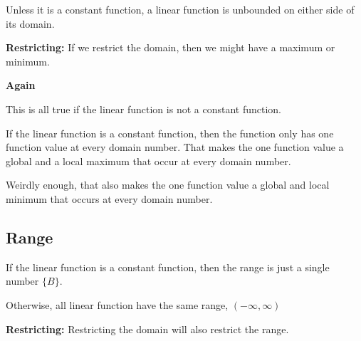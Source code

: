 \documentclass{ximera}
\begin{document}
Unless it is a constant function, a linear function is unbounded on either side of its domain.

\textbf{Restricting:} If we restrict the domain, then we might have a maximum or minimum. 



\begin{warning} \textbf{\textcolor{red!70!black}{Again}} 

This is all true if the linear function is not a constant function. 


If the linear function is a constant function, then the function only has one function value at every domain number.  That makes the one function value a global and a local maximum that occur at every domain number. 

Weirdly enough, that also makes the one function value a global and local minimum that occurs at every domain number.

\end{warning}



\subsection*{Range}


If the linear function is a constant function, then the range is just a single number $\{ B \}$. 

Otherwise, all linear function have the same range, $(-\infty, \infty)$ 

\textbf{Restricting:} Restricting the domain will also restrict the range.
\end{document}

